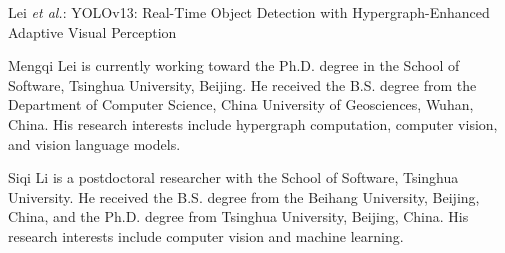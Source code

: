 \documentclass[lettersize,journal]{IEEEtran}
\begin{document}
%
{Lei \MakeLowercase{\textit{et al.}}: YOLOv13: Real-Time Object Detection with Hypergraph-Enhanced Adaptive Visual Perception}


\maketitle











 
 
% 


%




\begin{IEEEbiography}{Mengqi Lei} is currently working toward the Ph.D. degree in the School of Software, Tsinghua University, Beijing. He received the B.S. degree from the Department of Computer Science, China University of Geosciences, Wuhan, China. His research interests include hypergraph computation, computer vision, and vision language models.
\end{IEEEbiography}


\begin{IEEEbiography}{Siqi Li} is a postdoctoral researcher with the School of Software, Tsinghua University. He received the B.S. degree from the Beihang University, Beijing, China, and the Ph.D. degree from Tsinghua University, Beijing, China. His research interests include computer vision and machine learning.
\end{IEEEbiography}
\end{document}
